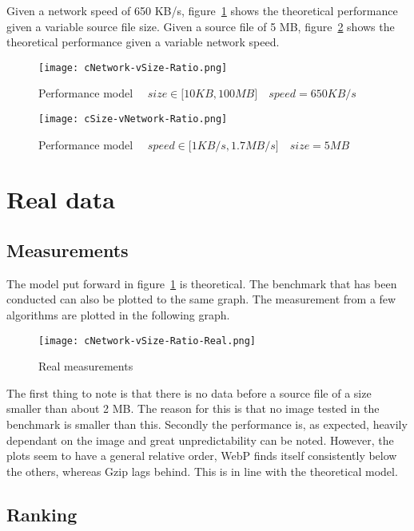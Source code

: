 \documentclass[11pt,a4paper]{report}
\begin{document}
Given a network speed of 650 KB/s, figure~\ref{fig:cNetwork-vSize-Ratio} shows the theoretical performance given a variable source file size. Given a source file of 5 MB, figure~\ref{fig:cSize-vNetwork-Ratio} shows the theoretical performance given a variable network speed.

\begin{figure}[!htb]
\centering
\texttt{[image: cNetwork-vSize-Ratio.png]}
\caption{\label{fig:cNetwork-vSize-Ratio} Performance model $\quad size \in \lbrack10KB, 100MB\rbrack \quad speed = 650KB/s$}
\end{figure}

\begin{figure}[!htb]
\centering
\texttt{[image: cSize-vNetwork-Ratio.png]}
\caption{\label{fig:cSize-vNetwork-Ratio} Performance model $\quad speed \in \lbrack 1KB/s, 1.7MB/s\rbrack \quad size = 5MB$}
\end{figure}

\newpage
\section{Real data}

\subsection{Measurements}

The model put forward in figure~\ref{fig:cNetwork-vSize-Ratio} is theoretical. The benchmark that has been conducted can also be plotted to the same graph. The measurement from a few algorithms are plotted in the following graph.

\begin{figure}[h!]
\centering
\texttt{[image: cNetwork-vSize-Ratio-Real.png]}
\caption{\label{fig:cNetwork-vSize-Ratio-Real} Real measurements}
\end{figure}

The first thing to note is that there is no data before a source file of a size smaller than about 2 MB. The reason for this is that no image tested in the benchmark is smaller than this. Secondly the performance is, as expected, heavily dependant on the image and great unpredictability can be noted. However, the plots seem to have a general relative order, WebP finds itself consistently below the others, whereas Gzip lags behind. This is in line with the theoretical model.

\newpage
\subsection{Ranking}
\end{document}
